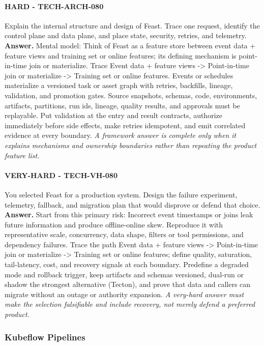 \paragraph{HARD - TECH-ARCH-080} Explain the internal structure and design of Feast. Trace one request, identify the control plane and data plane, and place state, security, retries, and telemetry.
\textbf{Answer.} Mental model: Think of Feast as a feature store between event data + feature views and training set or online features; its defining mechanism is point-in-time join or materialize. Trace Event data + feature views -> Point-in-time join or materialize -> Training set or online features. Events or schedules materialize a versioned task or asset graph with retries, backfills, lineage, validation, and promotion gates. Source snapshots, schemas, code, environments, artifacts, partitions, run ids, lineage, quality results, and approvals must be replayable. Put validation at the entry and result contracts, authorize immediately before side effects, make retries idempotent, and emit correlated evidence at every boundary.
\textit{A framework answer is complete only when it explains mechanisms and ownership boundaries rather than repeating the product feature list.}
\paragraph{VERY-HARD - TECH-VH-080} You selected Feast for a production system. Design the failure experiment, telemetry, fallback, and migration plan that would disprove or defend that choice.
\textbf{Answer.} Start from this primary risk: Incorrect event timestamps or joins leak future information and produce offline-online skew. Reproduce it with representative scale, concurrency, data shape, filters or tool permissions, and dependency failures. Trace the path Event data + feature views -> Point-in-time join or materialize -> Training set or online features; define quality, saturation, tail-latency, cost, and recovery signals at each boundary. Predefine a degraded mode and rollback trigger, keep artifacts and schemas versioned, dual-run or shadow the strongest alternative (Tecton), and prove that data and callers can migrate without an outage or authority expansion.
\textit{A very-hard answer must make the selection falsifiable and include recovery, not merely defend a preferred product.}
\subsubsection*{Kubeflow Pipelines}

